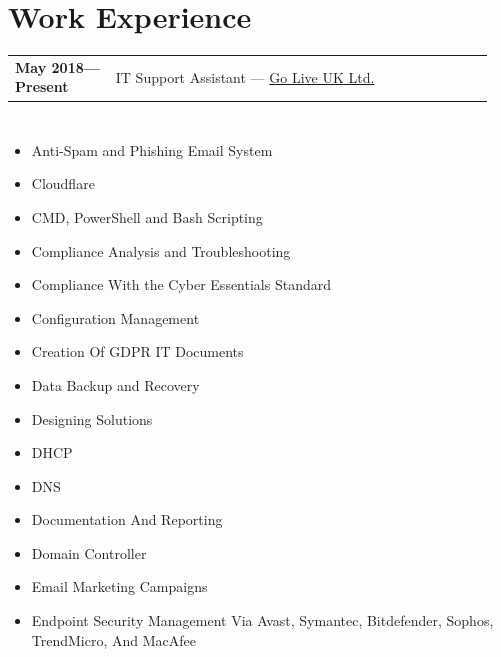 \documentclass[letterpaper, 10pt]{article}
\begin{document}
	\newpage
	
	\section*{Work Experience}
	\begin{tabular}{@{}p{0.2\linewidth} p{0.75\linewidth}}
		\textbf{May 2018—Present} & IT Support Assistant — \href{https://www.goliveuk.com/}{Go Live UK Ltd.} \\
	\end{tabular}
	
	\begin{minipage}[t]{0.5\textwidth}
		\section*{}
		\begin{itemize}
			\item Anti-Spam and Phishing Email System
			
			\item Cloudflare
			
			\item CMD, PowerShell and Bash Scripting
			
			\item Compliance Analysis and Troubleshooting
			
			\item Compliance With the Cyber Essentials Standard
			
			\item Configuration Management
			
			\item Creation Of GDPR IT Documents
			
			\item Data Backup and Recovery
			
			\item Designing Solutions
			
			\item DHCP
			
			\item DNS
			
			\item Documentation And Reporting
			
			\item Domain Controller
			
			\item Email Marketing Campaigns
			
			\item Endpoint Security Management Via Avast, Symantec, Bitdefender,
			Sophos, TrendMicro, And MacAfee
			

\end{itemize}
\end{minipage}
\end{document}
